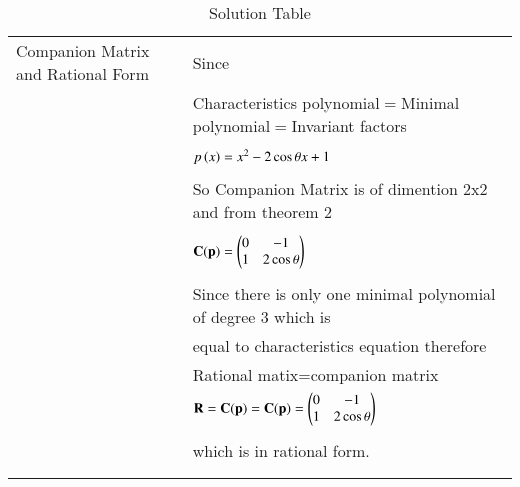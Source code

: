 \begin{longtable}{|l|l|}
\hline
\multirow{3}{*}{Companion Matrix and Rational Form} & \\
&Since\\
&\\
&Characteristics polynomial$=$Minimal polynomial$=$Invariant factors\\
&\\
&$p\left(x\right)=x^2-2\cos\theta x +1$\\
&\\
&So Companion Matrix is of dimention 2x2 and from theorem 2\\
&\\
&$\mathbf{C(p)}=\begin{pmatrix}0&-1\\1&2\cos\theta\end{pmatrix}$\\
&\\
&Since there is only one minimal polynomial of degree 3 
which is\\ &equal to characteristics equation therefore\\ &Rational matix=companion matrix\\ 
&$\mathbf{R}=\mathbf{C(p)}=\mathbf{C(p)}=\begin{pmatrix}0&-1\\1&2\cos\theta\end{pmatrix}$\\
&\\
&which is in rational form.\\
&\\
\hline

\caption{Solution Table}
\label{eq:solutions/7/2/7/table:2}
\end{longtable}
\twocolumn
